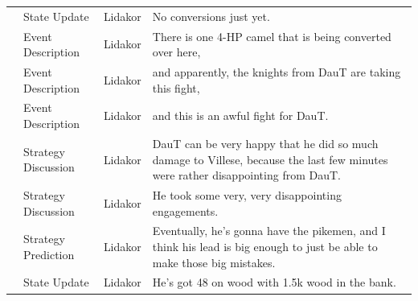 {\begin{longtable}{@{}>{\theAppRow}r|L{2.3cm}L{1.0cm}U{11.55cm}@{}}
    & State Update          & Lidakor & No conversions just yet.                                                                                                                                                                                                                                                                        \\
    & Event Description     & Lidakor & There is one 4-HP camel that is being converted over here,                                                                                                                                                                                                                                      \\
    & Event Description     & Lidakor & and apparently, the knights from DauT are taking this fight,                                                                                                                                                                                                                                    \\
    & Event Description     & Lidakor & and this is an awful fight for DauT.                                                                                                                                                                                                                                                            \\
    & Strategy Discussion   & Lidakor & DauT can be very happy that he did so much damage to Villese, because the last few minutes were rather disappointing from DauT.                                                                                                                                                                 \\
    & Strategy Discussion   & Lidakor & He took some very, very disappointing engagements.                                                                                                                                                                                                                                              \\
    & Strategy Prediction   & Lidakor & Eventually, he's gonna have the pikemen, and I think his lead is big enough to just be able to make those big mistakes.                                                                                                                                                                         \\
    & State Update          & Lidakor & He's got 48 on wood with 1.5k wood in the bank.                                                                                                                                                                                                                                                 \\

\end{longtable}}
